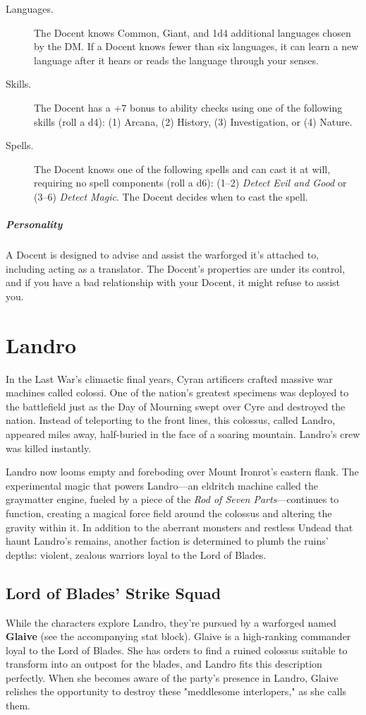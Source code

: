 \documentclass[10pt,a4paper,twoside,bg=print,twocolumn,openany,nodeprecatedcode]{dndbook}
\begin{document}
\begin{description}
\item[Languages.]
The Docent knows Common, Giant, and 1d4 additional languages chosen by the DM. If a Docent knows fewer than six languages, it can learn a new language after it hears or reads the language through your senses.
\item[Skills.]
The Docent has a +7 bonus to ability checks using one of the following skills (roll a d4): (1) Arcana, (2) History, (3) Investigation, or (4) Nature.
\item[Spells.]
The Docent knows one of the following spells and can cast it at will, requiring no spell components (roll a d6): (1–2) \textit{Detect Evil and Good} or (3–6) \textit{Detect Magic}. The Docent decides when to cast the spell.
\end{description}

\subparagraph{Personality}
A Docent is designed to advise and assist the warforged it's attached to, including acting as a translator. The Docent's properties are under its control, and if you have a bad relationship with your Docent, it might refuse to assist you.

\section{Landro}
In the Last War's climactic final years, Cyran artificers crafted massive war machines called colossi. One of the nation's greatest specimens was deployed to the battlefield just as the Day of Mourning swept over Cyre and destroyed the nation. Instead of teleporting to the front lines, this colossus, called Landro, appeared miles away, half-buried in the face of a soaring mountain. Landro's crew was killed instantly.

Landro now looms empty and foreboding over Mount Ironrot's eastern flank. The experimental magic that powers Landro—an eldritch machine called the graymatter engine, fueled by a piece of the \textit{Rod of Seven Parts}—continues to function, creating a magical force field around the colossus and altering the gravity within it. In addition to the aberrant monsters and restless Undead that haunt Landro's remains, another faction is determined to plumb the ruins' depths: violent, zealous warriors loyal to the Lord of Blades.

\subsection{Lord of Blades' Strike Squad}
While the characters explore Landro, they're pursued by a warforged named \textbf{Glaive} (see the accompanying stat block). Glaive is a high-ranking commander loyal to the Lord of Blades. She has orders to find a ruined colossus suitable to transform into an outpost for the blades, and Landro fits this description perfectly. When she becomes aware of the party's presence in Landro, Glaive relishes the opportunity to destroy these "meddlesome interlopers," as she calls them.
\end{document}
